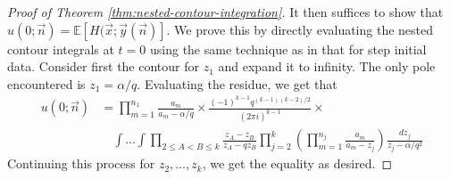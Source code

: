 \begin{proof}[Proof of Theorem \ref{thm:nested-contour-integration}]
It then suffices to show that $u(0;\vec{n}) = \mathbb{E} [H(\vec{x}; \vec{y}(\vec{n})]$. We prove this by directly evaluating the nested contour integrals at $t = 0$ using the same technique as in that for step initial data. Consider first the contour for $z_1$ and expand it to infinity. The only pole encountered is $z_1 = \alpha / q$. Evaluating the residue, we get that 
\begin{align*}
u(0;\vec{n}) &= \prod_{m=1}^{n_1} \frac{a_m}{a_m - \alpha / q} \times \frac{(-1)^{k-1} q^{(k-1)(k-2)/2}}{(2 \pi i)^{k-1}} \times \\
& \quad \int \dots \int \prod_{2 \le A < B \le k} \frac{z_A - z_B}{z_A - qz_B} \prod_{j=2}^k \left( \prod_{m=1}^{n_j} \frac{a_m}{a_m - z_j}\right) \frac{dz_j}{z_j - \alpha/q^2}
\end{align*}
Continuing this process for $z_2, \dots, z_k$, we get the equality as desired. 
\end{proof}